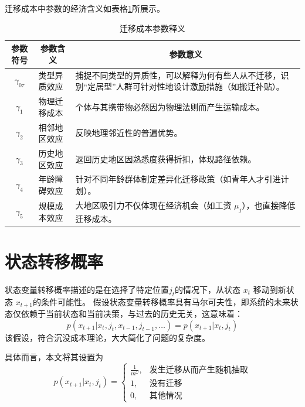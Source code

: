 \documentclass[a4paper,12pt,oneside]{book} %
\begin{document}
迁移成本中参数的经济含义如表格\ref{tab:迁移成本参数释义}所展示。
\begin{table}[!ht]
  \centering
  \begin{tabularx}{\textwidth}{@{}llX@{}}
    \toprule
    \multicolumn{1}{c}{\textbf{参数符号}} & \multicolumn{1}{c}{\textbf{参数含义}} & \multicolumn{1}{c}{\textbf{参数意义}} \\ \midrule
    \multicolumn{1}{c}{$\gamma_{0\tau}$} & 类型异质效应 & 捕捉不同类型的异质性，可以解释为何有些人从不迁移，识别“定居型”人群可针对性地设计激励措施（如搬迁补贴）。\\ 
    \multicolumn{1}{c}{$\gamma_1$} & 物理迁移成本 & 个体与其携带物必然因为物理法则而产生运输成本。 \\ 
    \multicolumn{1}{c}{$\gamma_2$} & 相邻地区效应 & 反映地理邻近性的普遍优势。 \\ 
    \multicolumn{1}{c}{$\gamma_3$} & 历史地区效应 & 返回历史地区因熟悉度获得折扣，体现路径依赖。 \\ 
    \multicolumn{1}{c}{$\gamma_4$} & 年龄障碍效应 & 针对不同年龄群体制定差异化迁移政策（如青年人才引进计划）。\\ 
    \multicolumn{1}{c}{$\gamma_5$} & 规模成本效应 & 大地区吸引力不仅体现在经济机会（如工资 $\mu_j$），也直接降低迁移成本。\\ \bottomrule
  \end{tabularx}
  \caption{迁移成本参数释义}
  \label{tab:迁移成本参数释义}
\end{table}



\section{状态转移概率}

状态变量转移概率描述的是在选择了特定位置$j_{t}$的情况下，从状态 $x_t$ 移动到新状态 $x_{t+1}$的条件可能性。
假设状态变量转移概率具有马尔可夫性，即系统的未来状态仅依赖于当前状态和当前决策，与过去的历史无关，这意味着：
\begin{equation}
  p(x_{t+1}|x_{t},j_{t},x_{t-1},j_{t-1},\ldots)=p(x_{t+1}|x_{t},j_{t})
\end{equation}
该假设，符合沉没成本理论，大大简化了问题的复杂度。

具体而言，本文将其设置为
\begin{equation}
  p(x_{t+1}|x_t,j_t)=
  \begin{cases}
    \frac{1}{m^\omega}
    , &\text{发生迁移从而产生随机抽取}
    \\
    1
    , &\text{没有迁移}
    \\
    0
    , &\text{其他情况}
  \end{cases}
\end{equation}
\end{document}
